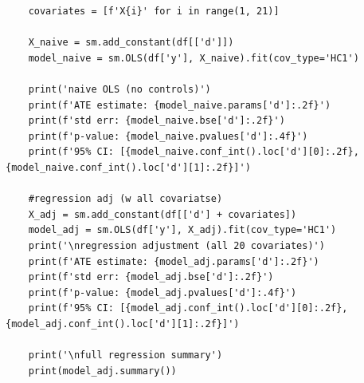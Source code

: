 \documentclass[10pt]{article}
\begin{document}
\begin{lstlisting}
    covariates = [f'X{i}' for i in range(1, 21)]

    X_naive = sm.add_constant(df[['d']])
    model_naive = sm.OLS(df['y'], X_naive).fit(cov_type='HC1')

    print('naive OLS (no controls)')
    print(f'ATE estimate: {model_naive.params['d']:.2f}')
    print(f'std err: {model_naive.bse['d']:.2f}')
    print(f'p-value: {model_naive.pvalues['d']:.4f}')
    print(f'95% CI: [{model_naive.conf_int().loc['d'][0]:.2f}, {model_naive.conf_int().loc['d'][1]:.2f}]')

    #regression adj (w all covariatse)
    X_adj = sm.add_constant(df[['d'] + covariates])
    model_adj = sm.OLS(df['y'], X_adj).fit(cov_type='HC1')
    print('\nregression adjustment (all 20 covariates)')
    print(f'ATE estimate: {model_adj.params['d']:.2f}')
    print(f'std err: {model_adj.bse['d']:.2f}')
    print(f'p-value: {model_adj.pvalues['d']:.4f}')
    print(f'95% CI: [{model_adj.conf_int().loc['d'][0]:.2f}, {model_adj.conf_int().loc['d'][1]:.2f}]')

    print('\nfull regression summary')
    print(model_adj.summary())
\end{lstlisting}
\end{document}
